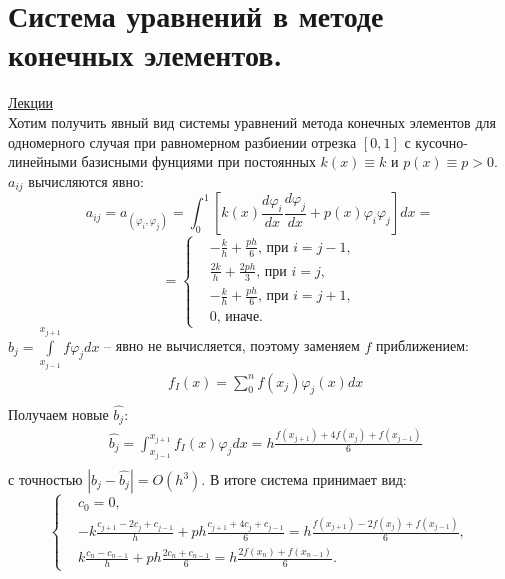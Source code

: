 \documentclass[specialist, subf, href, colorlinks=true, 12pt, times, mtpro, final]{disser}
\theoremstyle{definition}
\begin{document}
{\section {Система уравнений в методе конечных элементов.}
    \hyperlink {lects.106}{Лекции}\\
    Хотим получить явный вид системы уравнений метода конечных элементов для одномерного случая при равномерном разбиении отрезка $[0,1]$ с кусочно-линейными базисными фунциями при постоянных $k(x) \equiv k$ и $p(x) \equiv p > 0$.\\
    $a_{ij}$ вычисляются явно:
    $$
        a_{ij} = a_(\varphi_i, \varphi_j) = \int_0^1\left[k(x) \frac{d \varphi_i}{dx} \frac{d \varphi_j}{dx} + p(x) \varphi_i \varphi_j\right]dx =
    $$
    $$
        =
        \left\{
        \begin{aligned}
            & - \frac{k}{h} + \frac{ph}{6} \text{, при } i =j-1,\\
            & \frac{2k}{h} + \frac{2ph}{3} \text{, при } i =j,\\
            & - \frac{k}{h} + \frac{ph}{6} \text{, при } i =j+1,\\
            & 0 \text{, иначе.}
        \end{aligned}
        \right.
    $$
    $b_{j} = \int\limits_{x_{j-1}}^{x_{j+1}} f \varphi_j dx$ -- явно не вычисляется, поэтому заменяем $f$ приближением:
    $$
        \begin{aligned}
            & f_I(x) = \sum_0^n f(x_j) \varphi_j(x) dx\\
        \end{aligned}
    $$
    Получаем новые $\hat{b_j}$:
    $$
        \begin{aligned}
            & \hat{b_j} = \int_{x_{j-1}}^{x_{j+1}} f_I(x) \varphi_j dx = h \frac{f(x_{j+1}) + 4f(x_j) + f(x_{j-1})}{6}\\
        \end{aligned}
    $$
    с точностью $|b_j - \hat{b_j}| = O(h^3)$.
    В итоге система принимает вид:
    $$
        \left\{
        \begin{aligned}
            & c_0 = 0,\\
            & -k \frac{c_{j+1} - 2 c_j + c_{j-1}}{h} + ph \frac{c_{j+1} + 4 c_j + c_{j-1}}{6} = h \frac{f(x_{j+1}) - 2 f(x_j) + f(x_{j-1})}{6},\\
            & k \frac{c_n - c_{n-1}}{h} + ph \frac{2c_n + c_{n-1}}{6} = h \frac{2f(x_n) + f(x_{n-1})}{6}.
        \end{aligned}
        \right.
    $$

}
\end{document}

